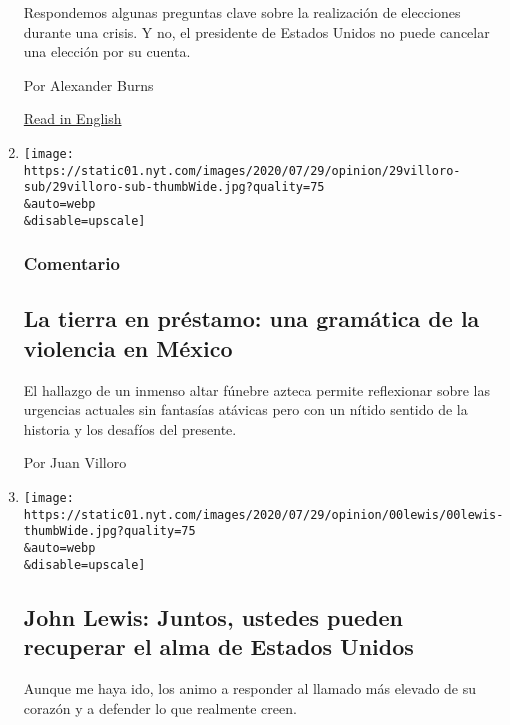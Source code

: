 \begin{enumerate}
  Respondemos algunas preguntas clave sobre la realización de elecciones
  durante una crisis. Y no, el presidente de Estados Unidos no puede
  cancelar una elección por su cuenta.

  Por Alexander Burns

  \href{https://www.nytimes.com/2020/07/30/us/politics/trump-postpone-election.html}{Read
  in English}
\item
  \href{/es/2020/07/30/espanol/opinion/aztecas-violencia-narco-amlo.html}{}

  \texttt{[image: https://static01.nyt.com/images/2020/07/29/opinion/29villoro-sub/29villoro-sub-thumbWide.jpg?quality=75\\\&auto=webp\\\&disable=upscale]}

  \hypertarget{comentario-2}{%
  \subsubsection{Comentario}\label{comentario-2}}

  \hypertarget{la-tierra-en-pruxe9stamo-una-gramuxe1tica-de-la-violencia-en-muxe9xico-1}{%
  \subsection{La tierra en préstamo: una gramática de la violencia en
  México}\label{la-tierra-en-pruxe9stamo-una-gramuxe1tica-de-la-violencia-en-muxe9xico-1}}

  El hallazgo de un inmenso altar fúnebre azteca permite reflexionar
  sobre las urgencias actuales sin fantasías atávicas pero con un nítido
  sentido de la historia y los desafíos del presente.

  Por Juan Villoro
\item
  \href{/es/2020/07/30/espanol/opinion/john-lewis-derechos-civiles.html}{}

  \texttt{[image: https://static01.nyt.com/images/2020/07/29/opinion/00lewis/00lewis-thumbWide.jpg?quality=75\\\&auto=webp\\\&disable=upscale]}

  \hypertarget{john-lewis-juntos-ustedes-pueden-recuperar-el-alma-de-estados-unidos}{%
  \subsection{John Lewis: Juntos, ustedes pueden recuperar el alma de
  Estados
  Unidos}\label{john-lewis-juntos-ustedes-pueden-recuperar-el-alma-de-estados-unidos}}

  Aunque me haya ido, los animo a responder al llamado más elevado de su
  corazón y a defender lo que realmente creen.


\end{enumerate}
